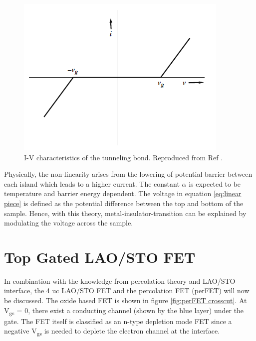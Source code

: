\documentclass[11pt,a4paper]{report}
\begin{document}
\begin{figure}
    \centering
    \includegraphics[scale = 0.9]{Figures/Piecewise-function.png}
    \caption{I-V characteristics of the tunneling bond. Reproduced from Ref \cite{Stauffer_RRTN_2009}.}
    \label{fig:piecewise-function}
\end{figure}

Physically, the non-linearity arises from the lowering of potential barrier between each island which leads to a higher current. The constant $\alpha$ is expected to be temperature and barrier energy dependent. The voltage in equation \ref{eq:linear piece} is defined as the potential difference between the top and bottom of the sample. Hence, with this theory, metal-insulator-transition can be explained by modulating the voltage across the sample.


\section{Top Gated LAO/STO FET}
In combination with the knowledge from percolation theory and LAO/STO interface, the 4 uc LAO/STO FET and the percolation FET (perFET) will now be discussed. The oxide based FET is shown in figure \ref{fig:perFET crosscut}. At V\textsubscript{gs} = 0, there exist a conducting channel (shown by the blue layer) under the gate. The FET itself is classified as an n-type depletion mode FET since a negative V\textsubscript{gs} is needed to deplete the electron channel at the interface.
\end{document}
